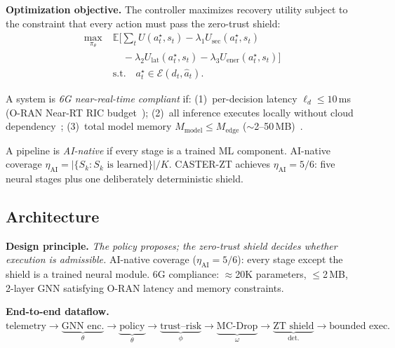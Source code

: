 \noindent\textbf{Optimization objective.}
The controller maximizes recovery utility subject to the constraint that every action must pass the zero-trust shield:
\begin{align*}
\max_{\pi_\theta}\;&\mathbb{E}\Big[\sum_{t} U(a_t^\star, s_t) - \lambda_1 U_{\mathrm{sec}}(a_t^\star, s_t) \\
&\quad- \lambda_2 U_{\mathrm{lat}}(a_t^\star, s_t) - \lambda_3 U_{\mathrm{ener}}(a_t^\star, s_t)\Big]\\
&\text{s.t.}\quad a_t^\star \in \mathcal{E}(d_t, \hat{a}_t).
\end{align*}

\begin{definition}
\label{art3:def:6g_compliance}
A system is \emph{6G near-real-time compliant} if:
(1)~per-decision latency $\ell_d \le 10$\,ms (O-RAN Near-RT RIC budget~\cite{oran_official_architecture,oran_ngrg_2024});
(2)~all inference executes locally without cloud dependency~\cite{raftopoulos2024drl};
(3)~total model memory $M_{\mathrm{model}} \le M_{\mathrm{edge}}$ ($\sim$2--50\,MB)~\cite{oran_official_architecture,dasilva2024xapp}.
\end{definition}

\begin{definition}
\label{art3:def:ai_native}
A pipeline is \emph{AI-native} if every stage is a trained ML component.
AI-native coverage $\eta_{\mathrm{AI}} = |\{S_k : S_k\text{ is learned}\}|/K$.
CASTER-ZT achieves $\eta_{\mathrm{AI}} = 5/6$: five neural stages plus one deliberately deterministic shield.
\end{definition}


\subsection{Architecture}
\label{art3:sec:architecture}

\noindent\textbf{Design principle.}
\emph{The policy proposes; the zero-trust shield decides whether execution is admissible.}
AI-native coverage ($\eta_{\mathrm{AI}} = 5/6$): every stage except the shield is a trained neural module.
6G compliance: $\approx$20K parameters, $\le$2\,MB, 2-layer GNN satisfying O-RAN latency and memory constraints.

\noindent\textbf{End-to-end dataflow.}
{\small
$\text{telemetry} \to \underbrace{\text{GNN enc.}}_{\theta} \to \underbrace{\text{policy}}_{\theta} \to \underbrace{\text{trust--risk}}_{\phi} \to \underbrace{\text{MC-Drop}}_{\omega} \to \underbrace{\text{ZT shield}}_{\text{det.}} \to \text{bounded exec.}$
}

